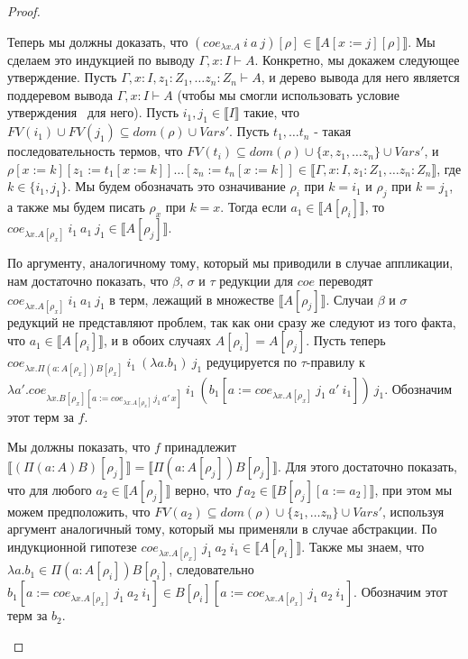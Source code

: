 \documentclass{amsart}
\theoremstyle{definition}
\theoremstyle{remark}
\renewcommand{\ll}{\llbracket}
\newcommand{\rr}{\rrbracket}
\numberwithin{figure}{section}
\begin{document}
\begin{proof}
\begin{itemize}
Теперь мы должны доказать, что $(coe_{\lambda x. A}\ i\ a\ j)[\rho] \in \ll A[x := j][\rho] \rr$.
Мы сделаем это индукцией по выводу $\Gamma, x : I \vdash A$.
Конкретно, мы докажем следующее утверждение.
Пусть $\Gamma, x : I, z_1 : Z_1, \ldots z_n : Z_n \vdash A$, и дерево вывода для него является поддеревом вывода
    $\Gamma, x : I \vdash A$ (чтобы мы смогли использовать условие утверждения~ для него).
Пусть $i_1, j_1 \in \ll I \rr$ такие, что $FV(i_1) \cup FV(j_1) \subseteq dom(\rho) \cup Vars'$.
Пусть $t_1, \ldots t_n$ - такая последовательность термов, что $FV(t_i) \subseteq dom(\rho) \cup \{ x, z_1, \ldots z_n \} \cup Vars'$, и
$\rho[x := k][z_1 := t_1[x := k]] \ldots [z_n := t_n[x := k]] \in \ll \Gamma, x : I, z_1 : Z_1, \ldots z_n : Z_n \rr$, где $k \in \{ i_1, j_1 \}$.
Мы будем обозначать это означивание $\rho_i$ при $k = i_1$ и $\rho_j$ при $k = j_1$, а также мы будем писать $\rho_x$ при $k = x$.
Тогда если $a_1 \in \ll A[\rho_i] \rr$, то $coe_{\lambda x. A[\rho_x]}\ i_1\ a_1\ j_1 \in \ll A[\rho_j] \rr$.

По аргументу, аналогичному тому, который мы приводили в случае аппликации, нам достаточно показать,
    что $\beta$, $\sigma$ и $\tau$ редукции для $coe$ переводят $coe_{\lambda x. A[\rho_x]}\ i_1\ a_1\ j_1$ в терм, лежащий в множестве $\ll A[\rho_j] \rr$.
Случаи $\beta$ и $\sigma$ редукций не представляют проблем, так как они сразу же следуют из того факта, что $a_1 \in \ll A[\rho_i] \rr$, и в обоих случаях $A[\rho_i] = A[\rho_j]$.
Пусть теперь $coe_{\lambda x. \Pi (a : A[\rho_x]) B[\rho_x]}\ i_1\ (\lambda a. b_1)\ j_1$ редуцируется по $\tau$-правилу к
    $\lambda a'. coe_{\lambda x. B[\rho_x][a := coe_{\lambda x. A[\rho_x]}\,j_1\,a'\,x]}\ i_1\ (b_1[a := coe_{\lambda x. A[\rho_x]}\ j_1\ a'\ i_1])\ j_1$.
Обозначим этот терм за $f$.

Мы должны показать, что $f$ принадлежит $\ll (\Pi (a : A) B)[\rho_j] \rr = \ll \Pi (a : A[\rho_j]) B[\rho_j]\rr$.
Для этого достаточно показать, что для любого $a_2 \in \ll A[\rho_j] \rr$ верно, что $f\,a_2 \in \ll B[\rho_j][a := a_2] \rr$,
    при этом мы можем предположить, что $FV(a_2) \subseteq dom(\rho) \cup \{ z_1, \ldots z_n \} \cup Vars'$, используя аргумент аналогичный тому, который мы применяли в случае абстракции.
По индукционной гипотезе $coe_{\lambda x. A[\rho_x]}\ j_1\ a_2\ i_1 \in \ll A[\rho_i] \rr$.
Также мы знаем, что $\lambda a. b_1 \in \Pi (a : A[\rho_i]) B[\rho_i]$,
    следовательно $b_1[a := coe_{\lambda x. A[\rho_x]}\ j_1\ a_2\ i_1] \in B[\rho_i][a := coe_{\lambda x. A[\rho_x]}\ j_1\ a_2\ i_1]$.
Обозначим этот терм за $b_2$.


\end{itemize}
\end{proof}
\end{document}
